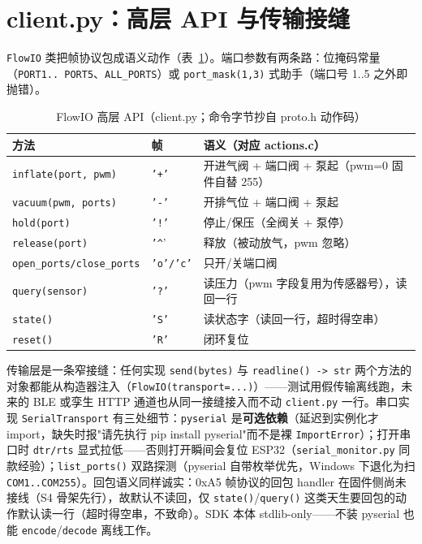 \section{client.py：高层 API 与传输接缝}
\label{sec:sdk-client}

\texttt{FlowIO} 类把帧协议包成语义动作（表~\ref{tab:sdk-api}）。端口参数有两条路：位掩码常量（\texttt{PORT1..\ PORT5}、\texttt{ALL\_PORTS}）或 \texttt{port\_mask(1,3)} 式助手（端口号 1..5 之外即抛错）。

\begin{table}[htbp]
  \centering
  \caption{FlowIO 高层 API（client.py；命令字节抄自 proto.h 动作码）}
  \label{tab:sdk-api}
  \begin{tabular}{llp{5.8cm}}
    \toprule
    方法 & 帧 & 语义（对应 actions.c） \\
    \midrule
    \texttt{inflate(port, pwm)} & \texttt{'+'} & 开进气阀 + 端口阀 + 泵起（pwm=0 固件自替 255） \\
    \texttt{vacuum(pwm, ports)} & \texttt{'-'} & 开排气位 + 端口阀 + 泵起 \\
    \texttt{hold(port)} & \texttt{'!'} & 停止/保压（全阀关 + 泵停） \\
    \texttt{release(port)} & \texttt{'\^{}}' & 释放（被动放气，pwm 忽略） \\
    \texttt{open\_ports/close\_ports} & \texttt{'o'/'c'} & 只开/关端口阀 \\
    \texttt{query(sensor)} & \texttt{'?'} & 读压力（pwm 字段复用为传感器号），读回一行 \\
    \texttt{state()} & \texttt{'S'} & 读状态字（读回一行，超时得空串） \\
    \texttt{reset()} & \texttt{'R'} & 闭环复位 \\
    \bottomrule
  \end{tabular}
\end{table}

传输层是一条窄接缝：任何实现 \texttt{send(bytes)} 与 \texttt{readline() -> str} 两个方法的对象都能从构造器注入（\texttt{FlowIO(transport=...)}）——测试用假传输离线跑，未来的 BLE 或孪生 HTTP 通道也从同一接缝接入而不动 \texttt{client.py} 一行。串口实现 \texttt{SerialTransport} 有三处细节：\texttt{pyserial} 是\textbf{可选依赖}（延迟到实例化才 import，缺失时报"请先执行 pip install pyserial"而不是裸 \texttt{ImportError}）；打开串口时 \texttt{dtr/rts} 显式拉低——否则打开瞬间会复位 ESP32（\texttt{serial\_monitor.py} 同款经验）；\texttt{list\_ports()} 双路探测（pyserial 自带枚举优先，Windows 下退化为扫 \texttt{COM1..COM255}）。回包语义同样诚实：0xA5 帧协议的回包 handler 在固件侧尚未接线（S4 骨架先行），故默认不读回，仅 \texttt{state()}/\texttt{query()} 这类天生要回包的动作默认读一行（超时得空串，不致命）。SDK 本体 stdlib-only——不装 pyserial 也能 \texttt{encode}/\texttt{decode} 离线工作。

